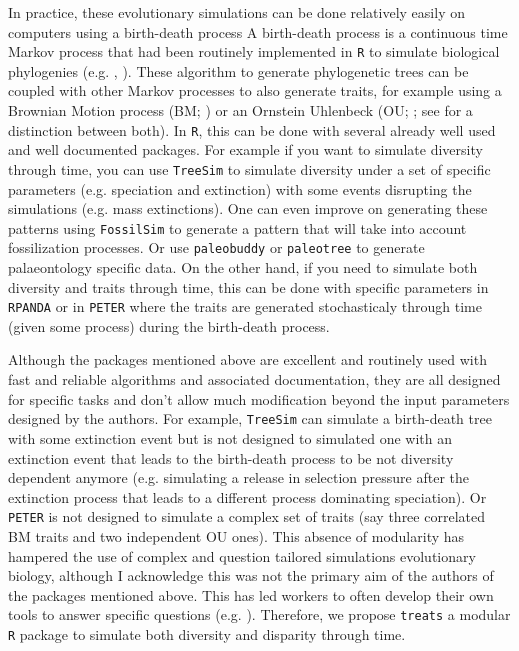 \documentclass[12pt,letterpaper]{article}
\newcommand{\treats}{\texttt{treats} }
\begin{document}
In practice, these evolutionary simulations can be done relatively easily on computers using a birth-death process \cite{feller1939birthdeath,stadler2010birthdeath,diversitree}
A birth-death process is a continuous time Markov process that had been routinely implemented in \texttt{R} \citep{R} to simulate biological phylogenies (e.g. \citealt{ape}, \citealt{diversitree}).
These algorithm to generate phylogenetic trees can be coupled with other Markov processes to also generate traits, for example using a Brownian Motion process (BM; \citealt{cavalli1967BM}) or an Ornstein Uhlenbeck  (OU; \citealt{lande1976OU}; see \citealt{cooper2016cautionary} for a distinction between both).
In \texttt{R}, this can be done with several already well used and well documented packages.
For example if you want to simulate diversity through time, you can use \texttt{TreeSim} \citep{treesim} to simulate diversity under a set of specific parameters (e.g. speciation and extinction) with some events disrupting the simulations (e.g. mass extinctions).
One can even improve on generating these patterns using \texttt{FossilSim} \citep{fossilsim} to generate a pattern that will take into account fossilization processes.
Or use \texttt{paleobuddy} \citep{paleobuddy} or \texttt{paleotree} \citep{paleotree} to generate palaeontology specific data.
On the other hand, if you need to simulate both diversity and traits through time, this can be done with specific parameters in \texttt{RPANDA} \citep{rpanda} or in \texttt{PETER} \citep{puttick2020complex} where the traits are generated stochasticaly through time (given some process) during the birth-death process.

Although the packages mentioned above are excellent and routinely used with fast and reliable algorithms and associated documentation, they are all designed for specific tasks and don't allow much modification beyond the input parameters designed by the authors.
For example, \texttt{TreeSim} can simulate a birth-death tree with some extinction event but is not designed to simulated one with an extinction event that leads to the birth-death process to be not diversity dependent anymore (e.g. simulating a release in selection pressure after the extinction process that leads to a different process dominating speciation).
Or \texttt{PETER} is not designed to simulate a complex set of traits (say three correlated BM traits and two independent OU ones).
This absence of modularity has hampered the use of complex and question tailored simulations evolutionary biology, although I acknowledge this was not the primary aim of the authors of the packages mentioned above.
This has led workers to often develop their own tools to answer specific questions (e.g. \citealt{puttick2020complex}).
Therefore, we propose \treats a modular \texttt{R} package to simulate both diversity and disparity through time.
\end{document}
